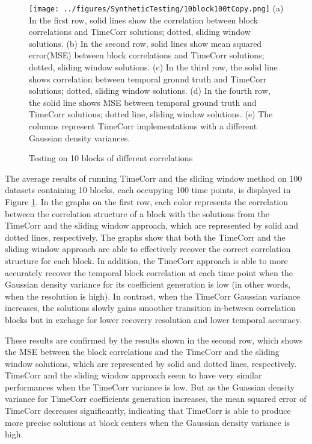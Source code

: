 \documentclass[11pt]{article}
\begin{document}
\begin{figure}[!htb]
\caption{Testing on 10 blocks of different correlations}
\texttt{[image: ../figures/SyntheticTesting/10block100tCopy.png]}
\label{fig:10block100t}
(a) In the first row, solid lines show the correlation between block correlations and TimeCorr solutions; dotted, sliding window solutions. (b) In the second row, solid lines show mean squared error(MSE) between block correlations and TimeCorr solutions; dotted, sliding window solutions. (c) In the third row, the solid line shows correlation between temporal ground truth and TimeCorr solutions; dotted, sliding window solutions. (d) In the fourth row, the solid line shows MSE between temporal ground truth and TimeCorr solutions; dotted line, sliding window solutions. (e) The columns represent TimeCorr implementations with a different Gaussian density variances.
\end{figure}

The average results of running TimeCorr and the sliding window method on 100 datasets containing 10 blocks, each occupying 100 time points, is displayed in Figure \ref{fig:10block100t}. In the graphs on the first row, each color represents the correlation between the correlation structure of a block with the solutions from the TimeCorr and the sliding window approach, which are represented by solid and dotted lines, respectively. The graphs show that both the TimeCorr and the sliding window approach are able to effectively recover the correct correlation structure for each block. In addition, the TimeCorr approach is able to more accurately recover the temporal block correlation at each time point when the Gaussian density variance for its coefficient generation is low (in other words, when the resolution is high). In contrast, when the TimeCorr Gaussian variance increases, the solutions slowly gains smoother transition in-between correlation blocks but in exchage for lower recovery resolution and lower temporal accuracy.

These results are confirmed by the results shown in the second row, which shows the MSE between the block correlations and the TimeCorr and the sliding window solutions, which are represented by solid and dotted lines, respectively. TimeCorr and the sliding window approach seem to have very similar performances when the TimeCorr variance is low. But as the Guassian density variance for TimeCorr coefficients generation increases, the mean squared error of TimeCorr decreases significantly, indicating that TimeCorr is able to produce more precise solutions at block centers when the Gaussian density variance is high.
\end{document}
